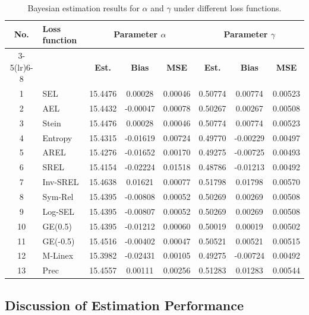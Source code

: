\documentclass[twoside]{article}
\begin{document}
\begin{table}[H]
\centering
\caption{Bayesian estimation results for $\alpha$ and $\gamma$ under different loss functions.}
\label{tab:combined_results}
\scriptsize
\setlength{\tabcolsep}{3pt}
\renewcommand{\arraystretch}{1.15}

\begin{tabularx}{\textwidth}{@{}c l c c c c c c@{}}
\toprule
\multirow{2}{*}{\textbf{No.}} &
\multirow{2}{*}{\textbf{Loss function}} &
\multicolumn{3}{c}{\textbf{Parameter $\alpha$}} &
\multicolumn{3}{c}{\textbf{Parameter $\gamma$}} \\
\cmidrule(lr){3-5}\cmidrule(lr){6-8}
& & \textbf{Est.} & \textbf{Bias} & \textbf{MSE} &
    \textbf{Est.} & \textbf{Bias} & \textbf{MSE} \\
\midrule
1  & SEL      & 15.4476 &  0.00028 & 0.00046 & 0.50774 &  0.00774 & 0.00523 \\
2  & AEL      & 15.4432 & -0.00047 & 0.00078 & 0.50267 &  0.00267 & 0.00508 \\
3  & Stein    & 15.4476 &  0.00028 & 0.00046 & 0.50774 &  0.00774 & 0.00523 \\
4  & Entropy  & 15.4315 & -0.01619 & 0.00724 & 0.49770 & -0.00229 & 0.00497 \\
5  & AREL     & 15.4276 & -0.01652 & 0.00170 & 0.49275 & -0.00725 & 0.00493 \\
6  & SREL     & 15.4154 & -0.02224 & 0.01518 & 0.48786 & -0.01213 & 0.00492 \\
7  & Inv-SREL & 15.4638 &  0.01621 & 0.00077 & 0.51798 &  0.01798 & 0.00570 \\
8  & Sym-Rel  & 15.4395 & -0.00808 & 0.00052 & 0.50269 &  0.00269 & 0.00508 \\
9  & Log-SEL  & 15.4395 & -0.00807 & 0.00052 & 0.50269 &  0.00269 & 0.00508 \\
10 & GE(0.5)  & 15.4395 & -0.01212 & 0.00060 & 0.50019 &  0.00019 & 0.00502 \\
11 & GE(-0.5) & 15.4516 & -0.00402 & 0.00047 & 0.50521 &  0.00521 & 0.00515 \\
12 & M-Linex  & 15.3982 & -0.02431 & 0.00105 & 0.49275 & -0.00724 & 0.00492 \\
13 & Prec     & 15.4557 &  0.00111 & 0.00256 & 0.51283 &  0.01283 & 0.00544 \\
\bottomrule
\end{tabularx}
\end{table}


\subsection{Discussion of Estimation Performance}
\end{document}

